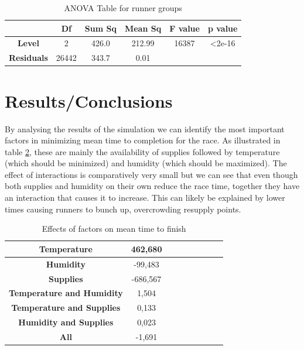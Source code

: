 \documentclass[conference]{IEEEtran}
\begin{document}
\begin{table}[htbp]
\caption{ANOVA Table for runner groups}
\begin{center}
\begin{tabular}{|c|c|c|c|c|c|}
\hline
    & \textbf{Df} & \textbf{Sum Sq} & \textbf{Mean Sq} & \textbf{F value} & \textbf{p value}\\
\hline
\textbf{Level} & 2&426.0&212.99&16387&\textless2e-16\\
\hline
\textbf{Residuals} & 26442&343.7&0.01&&\\
\hline
\end{tabular}
\label{tab:anova_validation}
\end{center}
\end{table}

\section{Results/Conclusions}

By analysing the results of the simulation we can identify the most important factors in minimizing mean time to completion for the race. As illustrated in table \ref{tab:results}, these are mainly the availability of supplies followed by temperature (which should be minimized) and humidity (which should be maximized). The effect of interactions is comparatively very small but we can see that even though both supplies and humidity on their own reduce the race time, together they have an interaction that causes it to increase. This can likely be explained by lower times causing runners to bunch up, overcrowding resupply points.

\begin{table}[htbp]
\caption{Effects of factors on mean time to finish}
\begin{center}
\begin{tabular}{|c|c|c|c|c|c|c|c|c|}
\hline
\textbf{Temperature} & 462,680\\
\hline
\textbf{Humidity} & -99,483\\
\hline
\textbf{Supplies} & -686,567\\
\hline
\textbf{Temperature and Humidity} & 1,504\\
\hline
\textbf{Temperature and Supplies}& 0,133\\
\hline
\textbf{Humidity and Supplies}&0,023\\
\hline
\textbf{All}&-1,691\\
\hline
\end{tabular}
\label{tab:results}
\end{center}
\end{table}
\end{document}
